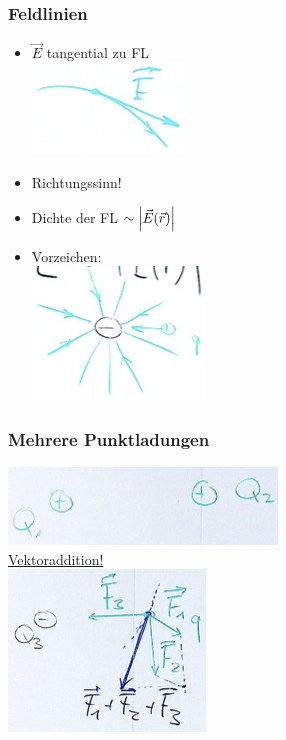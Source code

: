 \subsubsection{Feldlinien}
\begin{itemize}
	\item $\vec{E}$ tangential zu FL \\
		\includegraphics{Bild149}
	\item Richtungssinn!
	\item Dichte der FL $\sim \abs{\vec{E}(\vec{r})}$
	\item Vorzeichen: \\
		\includegraphics{Bild150}
\end{itemize}

\subsubsection{Mehrere Punktladungen}
\begin{bsp*}
	\includegraphics{Bild151} \\
	\uline{Vektoraddition!} \\
	\includegraphics{Bild152}
\end{bsp*}

